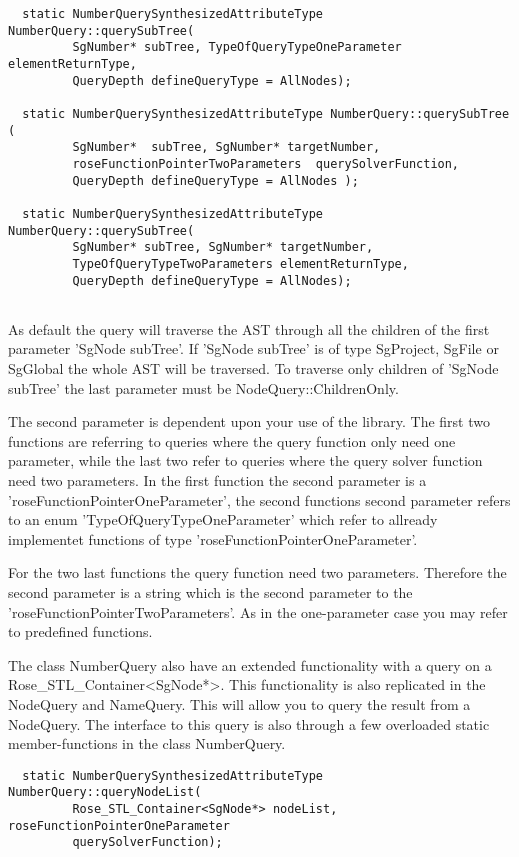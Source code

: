 {\begin{verbatim}
  static NumberQuerySynthesizedAttributeType NumberQuery::querySubTree( 
         SgNumber* subTree, TypeOfQueryTypeOneParameter elementReturnType,
         QueryDepth defineQueryType = AllNodes);
	 	
  static NumberQuerySynthesizedAttributeType NumberQuery::querySubTree (
         SgNumber*  subTree, SgNumber* targetNumber,
         roseFunctionPointerTwoParameters  querySolverFunction,
         QueryDepth defineQueryType = AllNodes );
	  
  static NumberQuerySynthesizedAttributeType NumberQuery::querySubTree( 
         SgNumber* subTree, SgNumber* targetNumber, 
         TypeOfQueryTypeTwoParameters elementReturnType,
         QueryDepth defineQueryType = AllNodes);
	  
\end{verbatim}  

As default the query will traverse the AST through all the children of the
first parameter 'SgNode subTree'. If 'SgNode subTree' is of type SgProject, 
SgFile or SgGlobal the whole AST will be traversed. To traverse only children
of 'SgNode subTree' the last parameter must be NodeQuery::ChildrenOnly. 

The second parameter is dependent upon your use of the library. The
first two functions are referring to queries where the query function
only need one parameter, while the last two refer to queries where the 
query solver function need two parameters. In the first function the second
parameter is a 'roseFunctionPointerOneParameter', the second functions
second parameter refers to an enum 'TypeOfQueryTypeOneParameter' which 
refer to allready implementet functions of type 
'roseFunctionPointerOneParameter'. 

For the two last functions the query function need two
parameters. Therefore the second parameter is a string which is the
second parameter to the 'roseFunctionPointerTwoParameters'. As in the
one-parameter case you may refer to predefined functions.

The class NumberQuery also have an extended functionality with a query
on a Rose_STL_Container<SgNode*>. This functionality is also replicated in the
NodeQuery and NameQuery. This will allow you to query the result
from a NodeQuery. The interface to this query is also through a few
overloaded static member-functions in the class NumberQuery.
\begin{verbatim}
  static NumberQuerySynthesizedAttributeType NumberQuery::queryNodeList(
         Rose_STL_Container<SgNode*> nodeList, roseFunctionPointerOneParameter
         querySolverFunction);


\end{verbatim}}
